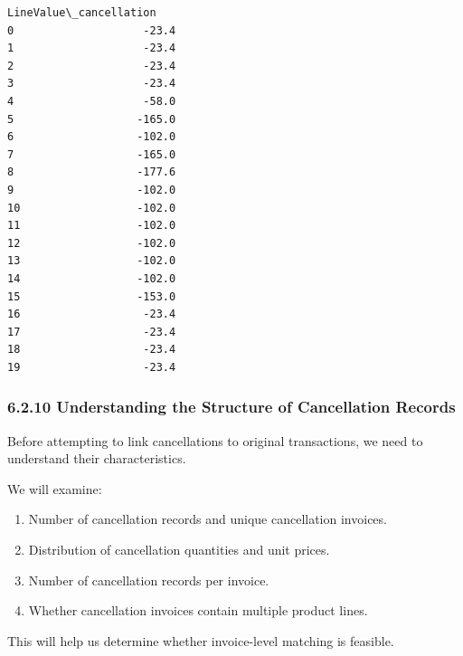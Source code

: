 \documentclass[11pt]{article}
\providecommand{\tightlist}{%
      \setlength{\itemsep}{0pt}\setlength{\parskip}{0pt}}
\begin{document}
\begin{Verbatim}[commandchars=\\\{\}]
    LineValue\_cancellation  
0                    -23.4  
1                    -23.4  
2                    -23.4  
3                    -23.4  
4                    -58.0  
5                   -165.0  
6                   -102.0  
7                   -165.0  
8                   -177.6  
9                   -102.0  
10                  -102.0  
11                  -102.0  
12                  -102.0  
13                  -102.0  
14                  -102.0  
15                  -153.0  
16                   -23.4  
17                   -23.4  
18                   -23.4  
19                   -23.4  
    \end{Verbatim}

    
    \subsubsection{6.2.10 Understanding the Structure of Cancellation
Records}\label{understanding-the-structure-of-cancellation-records}

Before attempting to link cancellations to original transactions, we
need to understand their characteristics.

We will examine:

\begin{enumerate}
\def\labelenumi{\arabic{enumi}.}
\tightlist
\item
  Number of cancellation records and unique cancellation invoices.
\item
  Distribution of cancellation quantities and unit prices.
\item
  Number of cancellation records per invoice.
\item
  Whether cancellation invoices contain multiple product lines.
\end{enumerate}

This will help us determine whether invoice-level matching is feasible.
\end{document}

